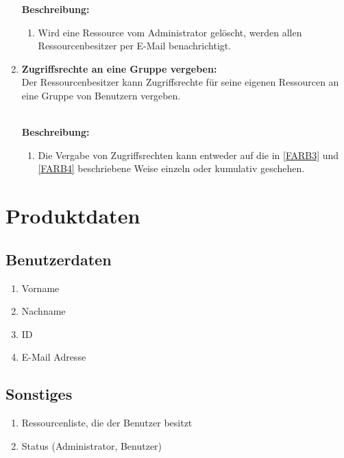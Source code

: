 \documentclass[parskip=full,11pt]{scrartcl}
\def\threedigits#1{%
  \ifnum#1<10 0\fi
  \ifnum#1<1 0\fi
  \number#1}
\begin{document}
\begin{enumerate}[label={\textbf{/F\protect\threedigits{\theenumi}0/}}, leftmargin=*, resume]
\textbf{Beschreibung:}\\
\begin{enumerate}[label=(\arabic*), leftmargin=*]
\item Wird eine Ressource vom Administrator gelöscht, werden allen Ressourcenbesitzer per E-Mail benachrichtigt.
\end{enumerate} %
\item \label{FARB8} \colorbox{shadecolor} {\textbf{Zugriffsrechte an eine Gruppe vergeben:}}\\
Der Ressourcenbesitzer kann Zugriffsrechte für seine eigenen Ressourcen an eine Gruppe von Benutzern vergeben.\\\

\textbf{Beschreibung:}\\
\begin{enumerate}[label=(\arabic*), leftmargin=*]
\item Die Vergabe von Zugriffsrechten kann entweder auf die in \ref{FARB3} und \ref{FARB4} beschriebene Weise einzeln oder kumulativ geschehen.
\end{enumerate}

\end{enumerate}


\section{Produktdaten}
\subsection{Benutzerdaten}
\begin{enumerate}[label={\textbf{/D\protect\threedigits{\theenumi}0/}}, leftmargin=*]
     		\item Vorname
     		\item Nachname
     		\item ID
     		\item E-Mail Adresse 
\end{enumerate}
     		 
\subsection{Sonstiges}
\begin{enumerate}[label={\textbf{/D\protect\threedigits{\theenumi}0/}}, leftmargin=*, resume]
		\item Ressourcenliste, die der Benutzer besitzt
        	\item Status (Administrator, Benutzer)     
\end{enumerate}
\end{document}
